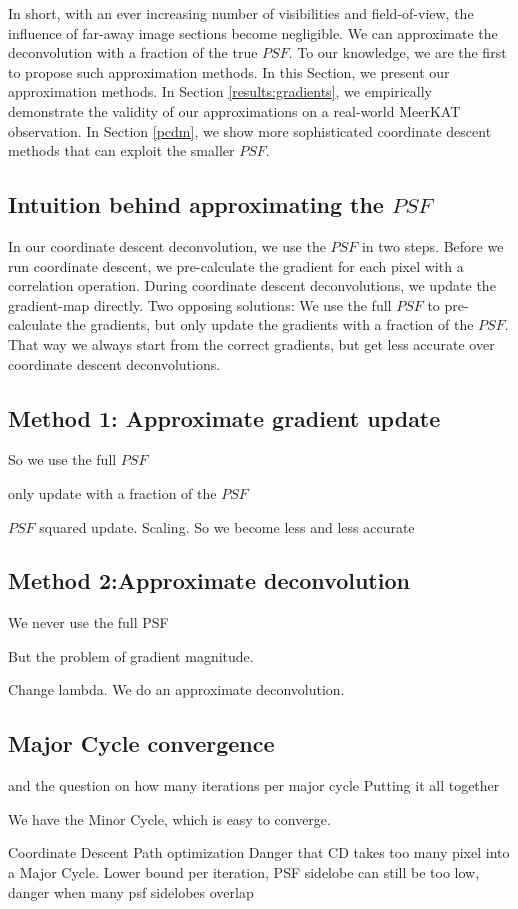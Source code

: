 In short, with an ever increasing number of visibilities and field-of-view, the influence of far-away image sections become negligible. We can approximate the deconvolution with a fraction of the true $PSF$. To our knowledge, we are the first to propose such approximation methods. In this Section, we present our approximation methods. In Section \ref{results:gradients}, we empirically demonstrate the validity of our approximations on a real-world MeerKAT observation. In Section \ref{pcdm}, we show more sophisticated coordinate descent methods that can exploit the smaller $PSF$. 

\subsection{Intuition behind approximating the $PSF$}

In our coordinate descent deconvolution, we use the $PSF$ in two steps. Before we run coordinate descent, we pre-calculate the gradient for each pixel with a correlation operation. During coordinate descent deconvolutions, we update the gradient-map directly. Two opposing solutions: We use the full $PSF$ to pre-calculate the gradients, but only update the gradients with a fraction of the $PSF$. That way we always start from the correct gradients, but get less accurate over coordinate descent deconvolutions.

\subsection{Method 1: Approximate gradient update}

So we use the full $PSF$

only update with a fraction of the $PSF$

$PSF$ squared update. Scaling.
So we become less and less accurate


\subsection{Method 2:Approximate deconvolution}

We never use the full PSF

But the problem of gradient magnitude. 

Change lambda. We do an approximate deconvolution. 


\subsection{Major Cycle convergence}\label{gradients:pathreg}
\cite{clark1980efficient} and the question on how many iterations per major cycle
Putting it all together

We have the Minor Cycle, which is easy to converge.

Coordinate Descent Path optimization \cite{friedman2010regularization}
Danger that CD takes too many pixel into a Major Cycle. Lower bound per iteration, PSF sidelobe
can still be too low, danger when many psf sidelobes overlap